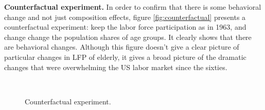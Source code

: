 \documentclass[
10pt, %
a4paper, %
oneside, %
headinclude,footinclude, %
BCOR5mm, %
]{scrartcl}
\begin{document}
\textbf{Counterfactual experiment.} In order to confirm that there is some behavioral change and not just composition effects, figure \vref{fig:counterfactual} presents a counterfactual experiment: keep the labor force participation as  in 1963, and change change the population shares of age groups. It clearly shows that there are behavioral changes. Although this figure doesn't give a clear picture of particular changes in LFP of elderly, it gives a broad picture of the dramatic changes that were overwhelming the US labor market since the sixties.
\begin{figure}[h]
\centering
{} \quad
{} \\
 \quad
\caption[]{Counterfactual experiment.} %
\label{fig:counterfactual}
\end{figure}
\end{document}
